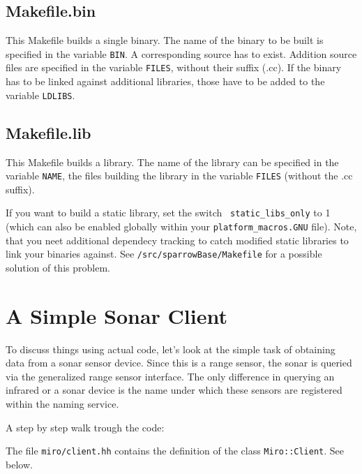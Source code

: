 \subsection{Makefile.bin}

This Makefile builds a single binary. The name of the binary to be
built is specified in the variable {\tt BIN}. A corresponding
source has to exist. Addition source files are specified in the
variable {\tt FILES}, without their suffix (.cc). If the binary has
to be linked against additional libraries, those have to be added to the
variable {\tt LDLIBS}.


\subsection{Makefile.lib}

This Makefile builds a library. The name of the library can be
specified in the variable {\tt NAME}, the files building the
library in the variable {\tt FILES} (without the .cc suffix).

If you want to build a static library, set the switch {\tt
  static\_libs\_only} to 1 (which can also be enabled globally within
your \texttt{platform\_macros.GNU} file). Note, that you neet
additional dependecy tracking to catch modified static libraries to
link your binaries against. See \texttt{/src/sparrowBase/Makefile} for
a possible solution of this problem.

\section{A Simple Sonar Client}

To discuss things using actual code, let's look at the simple task of
obtaining data from a sonar sensor device. Since this is a range
sensor, the sonar is queried via the generalized range sensor
interface. The only difference in querying an infrared or a sonar
device is the name under which these sensors are registered within the
naming service.



A step by step walk trough the code:



The file \lstinline!miro/client.hh! contains the definition of the class
\lstinline!Miro::Client!. See below.



